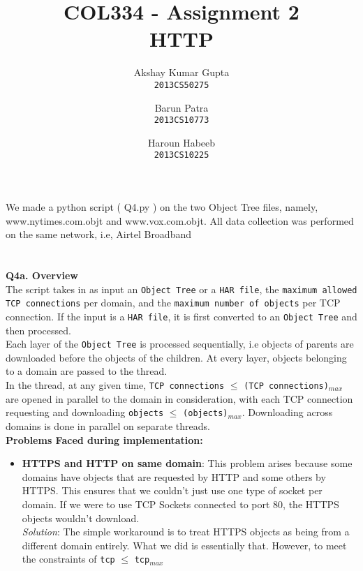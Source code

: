 \documentclass[12pt]{article}
\begin{document}
\title{COL334 - Assignment 2\\ HTTP}
\author{Akshay Kumar Gupta\\\texttt{2013CS50275} \and  Barun Patra\\\texttt{2013CS10773} \and Haroun Habeeb\\\texttt{2013CS10225}}
\date{}
\maketitle
\noindent 
We made a python script ( Q4.py ) on the two Object Tree files, namely, www.nytimes.com.objt and www.vox.com.objt. All data collection was performed on the same network, i.e, Airtel Broadband
\\\\\\
{\bfseries Q4a. Overview} %
\\The script takes in as input an \texttt{Object Tree} or a \texttt{HAR file}, the \texttt{maximum allowed TCP connections} per domain, and the \texttt{maximum number of objects} per TCP connection. If the input is a \texttt{HAR file}, it is first converted to an \texttt{Object Tree} and then processed. \\
Each layer of the \texttt{Object Tree} is processed sequentially, i.e objects of parents are downloaded before the objects of the children. At every layer, objects belonging to a domain are passed to the thread.\\ 
In the thread, at any given time, \texttt{TCP connections} $\leq$ \texttt{(TCP connections)$_{max}$} are opened in parallel to the domain in consideration, with each TCP connection requesting and downloading \texttt{objects} $\leq$ \texttt{(objects)$_{max}$}. Downloading across domains is done in parallel on separate threads.
\\
\textbf{Problems Faced during implementation:}
\begin{itemize}
\item \textbf{HTTPS and HTTP on same domain}: This problem arises because some domains have objects that are requested by HTTP and some others by HTTPS. This ensures that we couldn't just use one type of socket per domain. If we were to use TCP Sockets connected to port 80, the HTTPS objects wouldn't download.\\
\textit{Solution}: The simple workaround is to treat HTTPS objects as being from a different domain entirely. What we did is essentially that. However, to meet the constraints of \texttt{tcp} $\leq$ \texttt{tcp$_{max}$}

\end{itemize}
\end{document}

